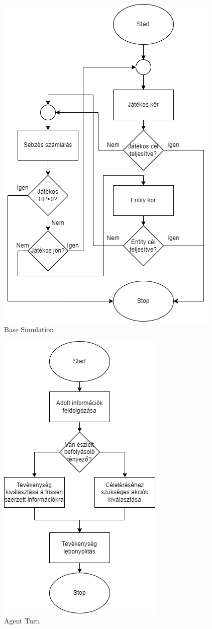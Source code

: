 \begin{figure}[!ht]
	\centering
	\includegraphics[scale=0.8]{images/gameUML.png}
	\caption{Base Simulation}
	\label{fig:basegame}
\end{figure}

\begin{figure}[!ht]
	\centering
	\includegraphics[scale=1]{images/entityturnUML.png}
	\caption{Agent Turn}
	\label{fig:entityturn}
\end{figure}

